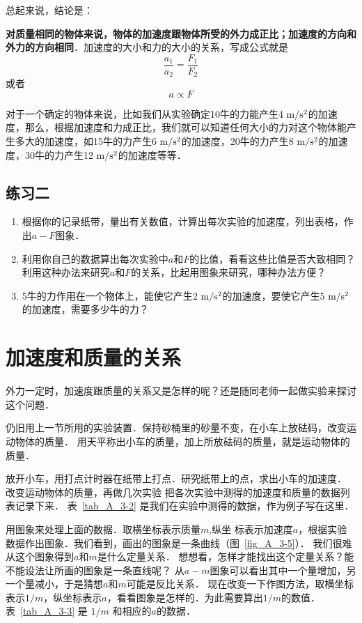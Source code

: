 总起来说，结论是：

\textbf{对质量相同的物体来说，物体的加速度跟物体所受的外力成正比；加速度的方向和外力的方向相同}．加速度的大小和力的大小的关系，写成公式就是
\[\frac{a_1}{a_2}=\frac{F_1}{F_2} \]
或者
\[a\propto F\]

对于一个确定的物体来说，比如我们从实验确定10牛的力能产生4$\;\text{m}/\text{s}^2$的加速度，那么，根据加速度和力成正比，我们就可以知道任何大小的力对这个物体能产生多大的加速度，如15牛的力产生6$\;\text{m}/\text{s}^2$的加速度，20牛的力产生8$\;\text{m}/\text{s}^2$的加速度，30牛的力产生12$\;\text{m}/\text{s}^2$的加速度等等．

\subsection*{练习二}
\begin{enumerate}
	\item 根据你的记录纸带，量出有关数值，计算出每次实验的加速度，列出表格，作出$a-F$图象．
	\item 利用你自己的数据算出每次实验中$a$和$F$的比值，看看这些比值是否大致相同？利用这种办法来研究$a$和$F$的关系，比起用图象来研究，哪种办法方便？
	\item 5牛的力作用在一个物体上，能使它产生2$\;\text{m}/\text{s}^2$的加速度，要使它产生5$\;\text{m}/\text{s}^2$的加速度，需要多少牛的力？
\end{enumerate}


\section{加速度和质量的关系}
外力一定时，加速度跟质量的关系又是怎样的呢？还是随同老师一起做实验来探讨这个问题．

仍旧用上一节所用的实验装置．保持砂桶里的砂量不变，在小车上放砝码，改变运动物体的质量．
用天平称出小车的质量，加上所放砝码的质量，就是运动物体的质量．

放开小车，用打点计时器在纸带上打点．研究纸带上的点，求出小车的加速度．
改变运动物体的质量，再做几次实验
把各次实验中测得的加速度和质量的数据列表记录下来．
表~\ref{tab_A_3-2} 是我们在实验中测得的数据，作为例子写在这里．

用图象来处理上面的数据．取横坐标表示质量$m$,纵坐
标表示加速度$a$，根据实验数据作出图象．我们看到，画出的图象是一条曲线（图~\ref{fig_A_3-5}）．
我们很难从这个图象得到$a$和$m$是什么定量关系．
想想看，怎样才能找出这个定量关系？能不能设法让所画的图象是一条直线呢？
从$a-m$图象可以看出其中一个量增加，另一个量减小，于是猜想$a$和$m$可能是反比关系．
现在改变一下作图方法，取横坐标表示$1/m$，纵坐标表示$a$，看看图象是怎样的．为此需要算出$1/m$的数值．
表~\ref{tab_A_3-3} 是 $1/m$ 和相应的$a$的数据．

